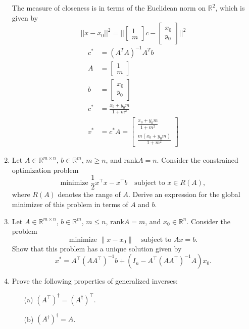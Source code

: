 \documentclass{article}
\begin{document}
\begin{enumerate}
The measure of closeness is in terms of the Euclidean norm on $\mathbb{R}^2$, which is given by $$||x - x_0||^2 = ||\begin{bmatrix} 1 \\ m \end{bmatrix}c - \begin{bmatrix} x_0 \\ y_0 \end{bmatrix}||^2$$
\begin{align*}
    c^* &= (A^TA)^{-1} A^T b \\
    A &= \begin{bmatrix}
        1\\ m
    \end{bmatrix} \\ b&=\begin{bmatrix}
        x_0 \\ y_0
    \end{bmatrix} \\
    c^* &= \frac{x_0+y_0m}{1+m^2} \\
    v^* &= c^*A = \begin{bmatrix}
        \frac{x_0+y_0m}{1+m^2} \\ \frac{m(x_0+y_0m)}{1+m^2}
    \end{bmatrix}
\end{align*}


\bigbreak
\item 
Let $A \in \mathbb{R}^{m \times n}$, $b \in \mathbb{R}^m$, $m \geq n$, and $\text{rank} A = n$. Consider the constrained optimization problem
\[
\text{minimize } \frac{1}{2} x^\top x - x^\top b \quad \text{subject to } x \in R(A),
\]
where $R(A)$ denotes the range of $A$. Derive an expression for the global minimizer of this problem in terms of $A$ and $b$.


\item Let $A \in \mathbb{R}^{m \times n}$, $b \in \mathbb{R}^m$, $m \leq n$, $\text{rank} A = m$, and $x_0 \in \mathbb{R}^n$. Consider the problem
\[
\text{minimize } \|x - x_0\| \quad \text{subject to } Ax = b.
\]
Show that this problem has a unique solution given by
\[
x^* = A^\top \left( AA^\top \right)^{-1} b + \left( I_n - A^\top \left( AA^\top \right)^{-1} A \right) x_0.
\]

\item Prove the following properties of generalized inverses:
\begin{enumerate}
    \item[(a)] $(A^\top)^\dagger = (A^\dagger)^\top$.
    \item[(b)] $(A^\dagger)^\dagger = A$.
\end{enumerate}

\end{enumerate}
\end{document}
